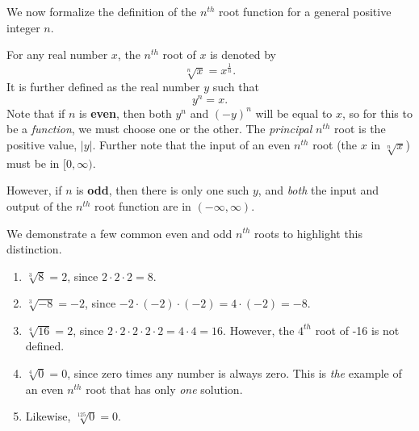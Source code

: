\documentclass{ximera}
\begin{document}
%
%

We now formalize the definition of the $n^{th}$ root function for a general positive integer $n$.

\begin{definition}
For any real number $x$, the $n^{th}$ root of $x$ is denoted by 
$$\sqrt[n]{x} = x^{\frac{1}{n}}.$$
%
It is further defined as the real number $y$ such that 
$$y^n = x.$$
Note that if $n$ is \textbf{even}, then both $y^n$ and $(-y)^n$ will be equal to $x$, so for this to be a {\em function}, we must choose one or the other. The {\em principal} $n^{th}$ root is the positive value, $|y|$. %
Further note that the input of an even $n^{th}$ root (the $x$ in $\sqrt[n]{x}$) must be in $[0,\infty)$. %

However, if $n$ is \textbf{odd}, then there is only one such $y$, and {\em both} the input and output of the $n^{th}$ root function are in $(-\infty,\infty)$.
\end{definition}

\begin{example}
We demonstrate a few common even and odd $n^{th}$ roots to highlight this distinction.
\begin{enumerate}
\item $\sqrt[3]{8} = 2$, since $2 \cdot 2 \cdot 2 = 8$.

\item $\sqrt[3]{-8} = - 2$, since $-2 \cdot (-2) \cdot (-2) = 4 \cdot (-2) = -8$.

\item $\sqrt[4]{16} = 2$, since $2 \cdot 2 \cdot 2 \cdot 2 \cdot 2 = 4 \cdot 4 = 16$. However, the $4^{th}$ root of -16 is not defined.

\item $\sqrt[4]{0} =0$, since zero times any number is always zero. This is {\em the} example of an even $n^{th}$ root that has only {\em one} solution.

\item Likewise, $\sqrt[125]{0} = 0$.
\end{enumerate}
\end{example}
\end{document}
